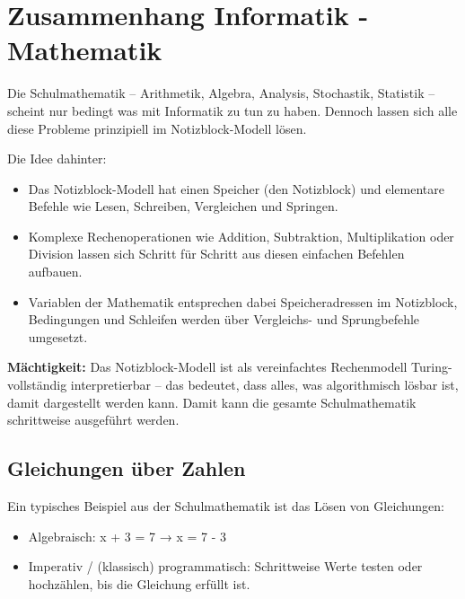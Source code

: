 \documentclass{article}
\begin{document}
              
        \section{Zusammenhang Informatik - Mathematik}
          
Die Schulmathematik – Arithmetik, Algebra, Analysis, Stochastik, Statistik – scheint nur bedingt was mit Informatik zu tun zu haben. Dennoch lassen sich alle diese Probleme prinzipiell im Notizblock-Modell lösen.


        
Die Idee dahinter:

        \begin{itemize}
          \item Das Notizblock-Modell hat einen Speicher (den Notizblock) und elementare Befehle wie Lesen, Schreiben, Vergleichen und Springen.

          \item Komplexe Rechenoperationen wie Addition, Subtraktion, Multiplikation oder Division lassen sich Schritt für Schritt aus diesen einfachen Befehlen aufbauen.

          \item Variablen der Mathematik entsprechen dabei Speicheradressen im Notizblock, Bedingungen und Schleifen werden über Vergleichs- und Sprungbefehle umgesetzt.

        \end{itemize}

        
  	\textbf{Mächtigkeit:} Das Notizblock-Modell ist als vereinfachtes Rechenmodell Turing-vollständig interpretierbar – das bedeutet, dass alles, was algorithmisch lösbar ist, damit dargestellt werden kann. Damit kann die gesamte Schulmathematik schrittweise ausgeführt werden.


        \subsection{Gleichungen über Zahlen}
        
Ein typisches Beispiel aus der Schulmathematik ist das Lösen von Gleichungen:

        \begin{itemize}
          \item Algebraisch: x + 3 = 7 → x = 7 - 3

          \item Imperativ / (klassisch) programmatisch: Schrittweise Werte testen oder hochzählen, bis die Gleichung erfüllt ist.

        \end{itemize}
        
\end{document}
